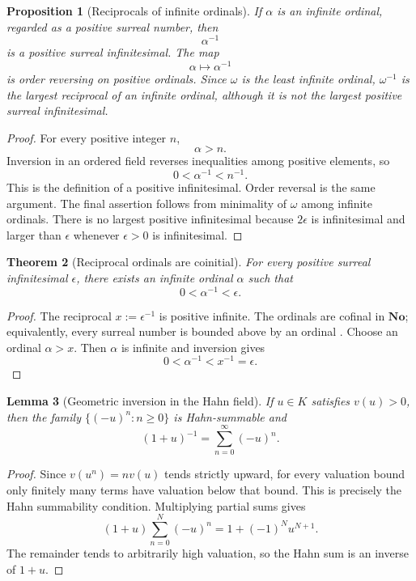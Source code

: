 \documentclass[11pt]{amsart}
\numberwithin{equation}{section}
\newtheorem{theorem}{Theorem}[section]
\newtheorem{proposition}[theorem]{Proposition}
\newtheorem{lemma}[theorem]{Lemma}
\theoremstyle{definition}
\newcommand{\No}{\mathbf{No}}
\begin{document}
\begin{proposition}[Reciprocals of infinite ordinals]\label{prop:ordinal-reciprocals}
If $\alpha$ is an infinite ordinal, regarded as a positive surreal number, then
\[
\alpha^{-1}
\]
is a positive surreal infinitesimal.  The map
\[
\alpha\longmapsto\alpha^{-1}
\]
is order reversing on positive ordinals.  Since $\omega$ is the least infinite ordinal, $\omega^{-1}$ is the largest reciprocal of an infinite ordinal, although it is not the largest positive surreal infinitesimal.
\end{proposition}

\begin{proof}
For every positive integer $n$,
\[
\alpha>n.
\]
Inversion in an ordered field reverses inequalities among positive elements, so
\[
0<\alpha^{-1}<n^{-1}.
\]
This is the definition of a positive infinitesimal.  Order reversal is the same argument.  The final assertion follows from minimality of $\omega$ among infinite ordinals.  There is no largest positive infinitesimal because $2\epsilon$ is infinitesimal and larger than $\epsilon$ whenever $\epsilon>0$ is infinitesimal.
\end{proof}

\begin{theorem}[Reciprocal ordinals are coinitial]\label{thm:reciprocal-coinitial}
For every positive surreal infinitesimal $\epsilon$, there exists an infinite ordinal $\alpha$ such that
\[
0<\alpha^{-1}<\epsilon.
\]
\end{theorem}

\begin{proof}
The reciprocal $x:=\epsilon^{-1}$ is positive infinite.  The ordinals are cofinal in $\No$; equivalently, every surreal number is bounded above by an ordinal \cite[Chap.~5]{Conway}.  Choose an ordinal $\alpha>x$.  Then $\alpha$ is infinite and inversion gives
\[
0<\alpha^{-1}<x^{-1}=\epsilon.
\]
\end{proof}

\begin{lemma}[Geometric inversion in the Hahn field]\label{lem:hahn-geometric}
If $u\in K$ satisfies $v(u)>0$, then the family $\{(-u)^n:n\ge0\}$ is Hahn-summable and
\[
(1+u)^{-1}=\sum_{n=0}^{\infty}(-u)^n.
\]
\end{lemma}

\begin{proof}
Since $v(u^n)=nv(u)$ tends strictly upward, for every valuation bound only finitely many terms have valuation below that bound.  This is precisely the Hahn summability condition.  Multiplying partial sums gives
\[
(1+u)\sum_{n=0}^{N}(-u)^n
=1+(-1)^Nu^{N+1}.
\]
The remainder tends to arbitrarily high valuation, so the Hahn sum is an inverse of $1+u$.
\end{proof}
\end{document}
